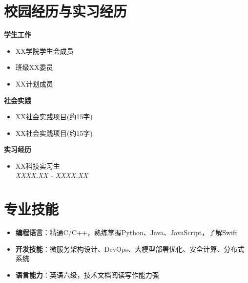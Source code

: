 \documentclass[a4paper]{article}
\begin{document}
\section*{校园经历与实习经历}
\hspace{-0.5cm}
\begin{minipage}[t]{0.37\textwidth}
\textbf{学生工作}
\begin{itemize}[leftmargin=*,itemsep=0em,topsep=0em]
\item XX学院学生会成员
\item 班级XX委员
\item XX计划成员
\end{itemize}
\end{minipage}
\begin{minipage}[t]{0.37\textwidth}
\textbf{社会实践}
\begin{itemize}[leftmargin=*,itemsep=0em,topsep=0em]
\item XX社会实践项目(约15字)
\item XX社会实践项目(约15字)
\end{itemize}
\end{minipage}
\begin{minipage}[t]{0.26\textwidth}
\textbf{实习经历}
\begin{itemize}[leftmargin=*,itemsep=0em,topsep=0em]
\item XX科技实习生\\
\textit{XXXX.XX - XXXX.XX}
\end{itemize}
\end{minipage}

\section*{专业技能}
\begin{itemize}[leftmargin=*,itemsep=0.1em,topsep=0.1em]
\item \textbf{编程语言}：精通C/C++，熟练掌握Python、Java、JavaScript，了解Swift
\item \textbf{开发技能}：微服务架构设计、DevOps、大模型部署优化、安全计算、分布式系统
\item \textbf{语言能力}：英语六级，技术文档阅读写作能力强
\end{itemize}
\end{document}
